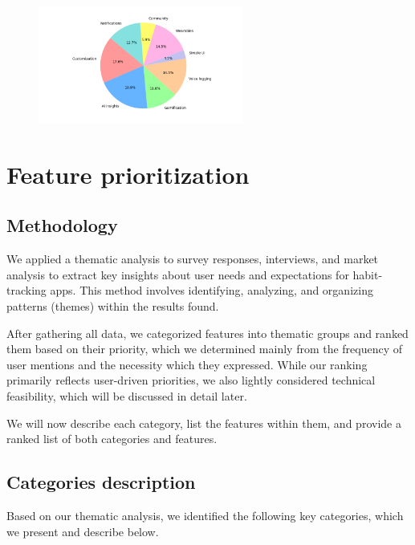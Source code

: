 \documentclass{article}
\begin{document}
\begin{figure}[H]
	\centering
	\includegraphics[width=0.6\textwidth]{images/user-aspects.png}
\end{figure}

\section{Feature prioritization}

\subsection{Methodology}

We applied a thematic analysis to survey responses, interviews, and market analysis to extract key insights about user needs and expectations for habit-tracking apps.
This method involves identifying, analyzing, and organizing patterns (themes) within the results found.

After gathering all data, we categorized features into thematic groups and ranked them based on their priority, which we determined mainly from the frequency of user mentions and the necessity which they expressed.
While our ranking primarily reflects user-driven priorities, we also lightly considered technical feasibility, which will be discussed in detail later.

We will now describe each category, list the features within them, and provide a ranked list of both categories and features.

\subsection{Categories description}

Based on our thematic analysis, we identified the following key categories, which we present and describe below.
\end{document}
